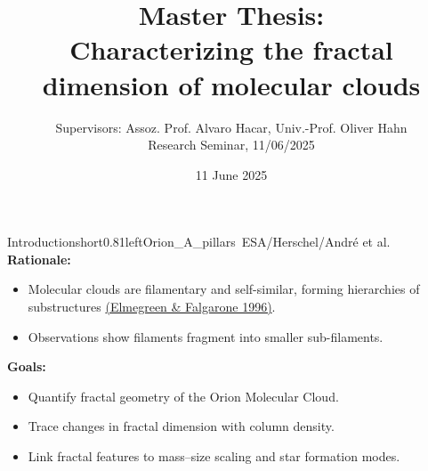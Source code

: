 \documentclass[hyperref={pdfpagelabels=false}, aspectratio=169, t]{beamer}  %
\title{Master Thesis: \\ Characterizing the fractal dimension of molecular clouds}											%
\subtitle{Supervisors: Assoz. Prof. Alvaro Hacar, Univ.-Prof. Oliver Hahn \\ Research Seminar, 11/06/2025}                   					%
\date{11 June 2025}              									%
\begin{document}

\maketitle
											
													




\begin{graphicsFrame}{Introduction}{short}{0.81}{left}{Orion_A_pillars}{\textcopyright~ESA/Herschel/André et al.}
	\textbf{Rationale:}
	\begin{itemize}
		\item Molecular clouds are filamentary and self-similar, forming hierarchies of substructures \href{https://ui.adsabs.harvard.edu/abs/1996ApJ...471..816E/abstract}{(Elmegreen \& Falgarone 1996)}.
		\item Observations show filaments fragment into smaller sub-filaments.
	\end{itemize}
	
	\vspace{1.2em}
	
	\textbf{Goals:}
	\begin{itemize}
		\item Quantify fractal geometry of the Orion Molecular Cloud.
		\item Trace changes in fractal dimension with column density.
		\item Link fractal features to mass–size scaling and star formation modes.
	\end{itemize}
\end{graphicsFrame}

\end{document}
